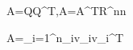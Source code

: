 A=Q\Lambda Q^T,\qquad A=A^T\in\mathbb R^{n\times n}

A=\sum_{i=1}^n\lambda_i\mathbf v_i\mathbf v_i^T

